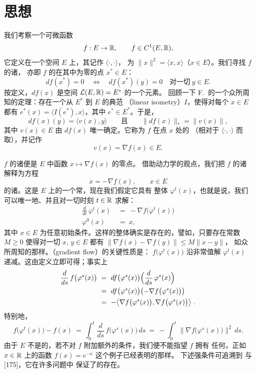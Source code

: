 
\section{\trMinimax{}思想}
\label{sec:minimax}

我们考察一个可微函数
\[
f:E\to\mathbb{R},\qquad f\in C^{1}(E,\mathbb{R}),
\]
它定义在一个\trHilbert{}空间 $E$ 上，其\trInnerProduct{}记作 $\langle\cdot,\cdot\rangle$，%
\trNorm{}为 $\|x\|^{2}=\langle x,x\rangle$（$x\in E$）。我们寻找 $f$ 的诸\trCriticalPoint，%
亦即 $f$ 的\trDerivative{}在其中为零的点 $x^{*}\in E$：
\[
df(x^{*})=0\quad\Longleftrightarrow\quad df(x^{*})(y)=0\quad\text{对一切}\ y\in E.
\]
按定义，$df(x)$ 是\trDual{}空间 $\mathcal{L}(E,\mathbb{R})=E^{*}$ 的一个元素。%
回顾一下 F.~\trRiesz{}的一个众所周知的定理：存在一个从 $E^{*}$ 到 $E$ 的典范%
\textbf{\trLinear\trIsometry\trIsomorphism}（linear isometry）$I$，使得对每个 $x\in E$ 都有%
$e^{*}(x)=\langle I(e^{*}),x\rangle$，其中 $e^{*}\in E^{*}$。于是，
\[
df(x)(y)=\langle v(x),y\rangle\qquad\text{且}\qquad\|df(x)\|_{*}=\|v(x)\|,
\]
其中 $v(x)\in E$ 由 $df(x)$ 唯一确定。它称为 $f$ 在点 $x$ 处的\trGradient{}%
（相对于\trInnerProduct{} $\langle\cdot,\cdot\rangle$ 而取），并记作
\[
v(x)=\nabla f(x)\in E.
\]

$f$ 的诸\trCriticalPoint{}便是 $E$ 中\trGradient{}函数 $x\mapsto\nabla f(x)$ 的零点。%
借助动力学的观点，我们把 $f$ 的诸\trCriticalPoint{}解释为\trGradient{}方程
\[
\dot{x}=-\nabla f(x),\qquad x\in E
\]
的诸\trEquilibrium。这是 $E$ 上的一个常\trDifferentialEquation，现在我们假定它具有%
整体\trFlow{} $\varphi^{t}(x)$，也就是说，我们可以唯一地、并且对一切时刻 $t\in\mathbb{R}$%
求解\trCauchy\trInitialValueProblem：
\begin{align*}
\frac{d}{dt}\,\varphi^{t}(x)\ &=\ -\nabla f\bigl(\varphi^{t}(x)\bigr)\\
\varphi^{0}(x)\ &=\ x,
\end{align*}
其中 $x\in E$ 为任意初始条件。这样的整体\trFlow{}确实是存在的，譬如，只要存在常数%
$M\geq0$ 使得对一切 $x$, $y\in E$ 都有 $\|\nabla f(x)-\nabla f(y)\|\leq M\|x-y\|$，%
如众所周知的那样。\textbf{\trGradient\trFlow}（gradient flow）的关键性质是：%
$f\bigl(\varphi^{t}(x)\bigr)$ 沿非常值解 $\varphi^{t}(x)$ 递减。这由定义立即可得；事实上
\begin{align*}
\frac{d}{ds}\,f\bigl(\varphi^{s}(x)\bigr)\ &=\ df\bigl(\varphi^{s}(x)\bigr)\Bigl(\frac{d}{ds}\,\varphi^{s}(x)\Bigr)\\
&=\ df\bigl(\varphi^{s}(x)\bigr)\bigl(-\nabla f\bigl(\varphi^{s}(x)\bigr)\bigr)\\
&=\ -\bigl\langle\nabla f\bigl(\varphi^{s}(x)\bigr),\nabla f\bigl(\varphi^{s}(x)\bigr)\bigr\rangle\ .
\end{align*}
特别地，
\begin{equation}\label{eq:gradient-flow-decrease}
f\bigl(\varphi^{t}(x)\bigr)-f(x)\ =\ \int_{0}^{t}\frac{d}{ds}\,f\bigl(\varphi^{s}(x)\bigr)\,ds\ =\ -\int_{0}^{t}\bigl\|\nabla f\bigl(\varphi^{s}(x)\bigr)\bigr\|^{2}\,ds.
\end{equation}
由于 $E$ 不是\trCompact{}的，若不对 $f$ 附加额外的条件，我们便不能指望 $f$ 拥有%
任何\trCriticalPoint，正如 $x\in\mathbb{R}$ 上的函数 $f(x)=e^{-x}$ 这个例子已经表明的那样。%
下述强\trCompactness{}条件可追溯到 \trPalais{}与 \trSmale{} [175]，它在许多\trVariational{}问题中%
保证了\trCriticalPoint{}的存在。

